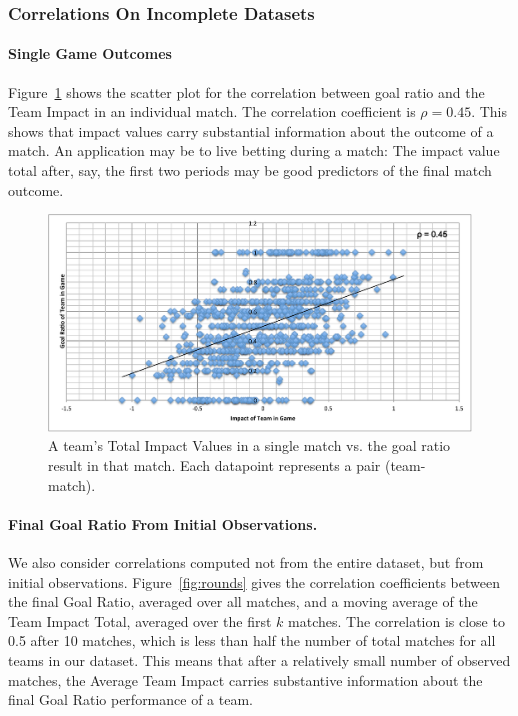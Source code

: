 \subsubsection{Correlations On Incomplete Datasets}

\paragraph{Single Game Outcomes} Figure~\ref{fig:single-match} shows the scatter plot for the correlation between goal ratio and the Team Impact in an individual match. The correlation coefficient is $\rho = 0.45$. This shows that impact values carry substantial information about the outcome of a match. An application may be to live betting during a match: The impact value total after, say, the first two periods may be good predictors of the final match outcome.

\begin{figure}
\centering 
\includegraphics[width=1\textwidth]
{game-team-impact}
\caption{A team's Total Impact Values in a single match vs. the goal ratio result in that match. Each datapoint represents a pair (team-match).}
\label{fig:single-match}
\end{figure}


\paragraph{Final Goal Ratio From Initial Observations.} We also consider correlations computed not from the entire dataset, but from initial observations. Figure~\ref{fig:rounds} gives the correlation coefficients between the final Goal Ratio, averaged over all matches, and a moving average of the Team Impact Total, averaged over the first $k$ matches. The correlation is close to 0.5 after 10 matches, which is less than half the number of total matches for all teams in our dataset. This means that after a relatively small number of observed matches, the Average Team Impact carries substantive information about the final Goal Ratio performance of a team.

